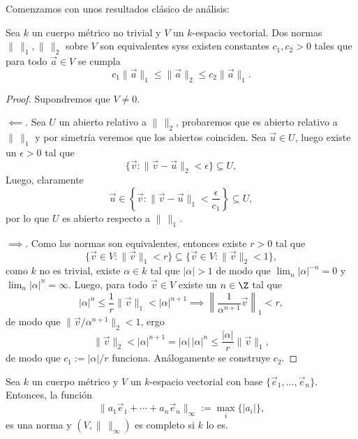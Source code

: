 \documentclass[teoria-numeros.tex]{subfiles}
\begin{document}
Comenzamos con unos resultados clásico de análisis:
\begin{lem}
	Sea $k$ un cuerpo métrico no trivial y $V$ un $k$-espacio vectorial.
	Dos normas $\|\,\|_1, \|\,\|_2$ sobre $V$ son equivalentes syss existen constantes $c_1, c_2 > 0$ tales que para todo $\vec a \in V$ se cumpla
	$$ c_1\|\vec a\|_1 \le \|\vec a\|_2 \le c_2\|\vec a\|_1. $$
\end{lem}
\begin{proof}
	Supondremos que $V \ne 0$.

	$\impliedby$. Sea $U$ un abierto relativo a $\|\,\|_2$, probaremos que es abierto relativo a $\|\,\|_1$ y por simetría veremos que los abiertos coinciden.
	Sea $\vec u \in U$, luego existe un $\epsilon > 0$ tal que
	$$ \{ \vec v : \| \vec v - \vec u \|_2 < \epsilon \} \subseteq U, $$
	Luego, claramente
	$$ \vec u \in \left\{ \vec v : \|\vec v - \vec u\|_1 < \frac{\epsilon}{c_1} \right\} \subseteq U, $$
	por lo que $U$ es abierto respecto a $\|\,\|_1$.

	$\implies$. Como las normas son equivalentes, entonces existe $r > 0$ tal que
	$$ \{ \vec v \in V : \|\vec v\|_1 < r \} \subseteq \{ \vec v \in V : \|\vec v\|_2 < 1 \}, $$
	como $k$ no es trivial, existe $\alpha \in k$ tal que $|\alpha| > 1$ de modo que $\lim_n |\alpha|^{-n} = 0$ y $\lim_n |\alpha|^n = \infty$.
	Luego, para todo $\vec v \in V$ existe un $n \in \Z$ tal que
	$$ |\alpha|^n \le \frac{1}{r}\|\vec v\|_1 < |\alpha|^{n+1} \implies \left\| \frac{1}{\alpha^{n+1}} \vec v \right\|_1 < r, $$
	de modo que $\| \vec v / \alpha^{n+1} \|_2 < 1$, ergo
	$$ \| \vec v \|_2 < |\alpha|^{n+1} = |\alpha| \, |\alpha|^n \le \frac{|\alpha|}{r} \|\vec v\|_1, $$
	de modo que $c_1 := |\alpha|/r$ funciona.
	Análogamente se construye $c_2$.
\end{proof}

\addtocounter{thmi}{1}
\begin{slem}
	Sea $k$ un cuerpo métrico y $V$ un $k$-espacio vectorial con base $\{ \vec e_1, \dots, \vec e_n \}$.
	Entonces, la función
	$$ \| a_1\vec e_1 + \cdots + a_n\vec e_n \|_\infty := \max_i\{ |a_i| \}, $$
	es una norma y $(V, \|\,\|_\infty)$ es completo si $k$ lo es.
\end{slem}
\addtocounter{thmi}{-1}
\end{document}
